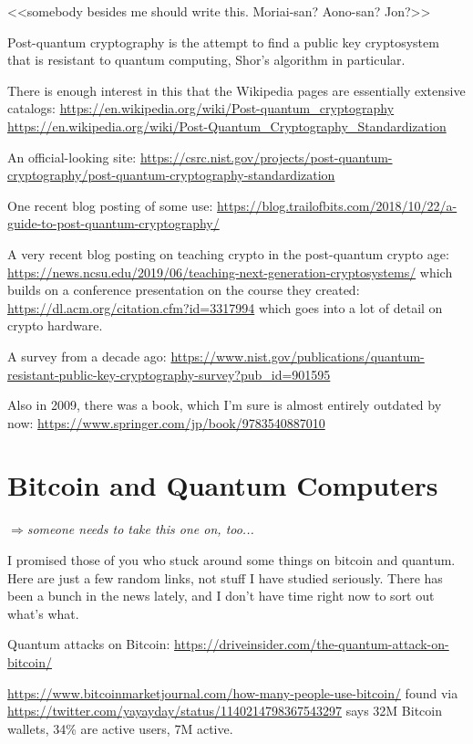 \documentclass[%
 aip,
 jmp,%
 amsmath,amssymb,
 reprint,%
]{revtex4-1}
\def\comment#1{{\color{ForestGreen}$\Rightarrow${\small\em #1}}}
\begin{document}
<<somebody besides me should write this.  Moriai-san?  Aono-san?  Jon?>>

Post-quantum cryptography is the attempt to find a public key
cryptosystem that is resistant to quantum computing, Shor's algorithm
in particular.

There is enough interest in this that the Wikipedia pages are
essentially extensive catalogs:
\url{https://en.wikipedia.org/wiki/Post-quantum_cryptography}
\url{https://en.wikipedia.org/wiki/Post-Quantum_Cryptography_Standardization}

An official-looking site:
\url{https://csrc.nist.gov/projects/post-quantum-cryptography/post-quantum-cryptography-standardization}

One recent blog posting of some use:
\url{https://blog.trailofbits.com/2018/10/22/a-guide-to-post-quantum-cryptography/}

A very recent blog posting on teaching crypto in the post-quantum
crypto age:
\url{https://news.ncsu.edu/2019/06/teaching-next-generation-cryptosystems/}
which builds on a conference presentation on the course they created:
\url{https://dl.acm.org/citation.cfm?id=3317994}
which goes into a lot of detail on crypto hardware.

A survey from a decade ago:
\url{https://www.nist.gov/publications/quantum-resistant-public-key-cryptography-survey?pub_id=901595}

Also in 2009, there was a book, which I'm sure is almost entirely
outdated by now:
\url{https://www.springer.com/jp/book/9783540887010}

\section{Bitcoin and Quantum Computers}

\comment{someone needs to take this one on, too...}

I promised those of you who stuck around some things on bitcoin and
quantum.  Here are just a few random links, not stuff I have studied
seriously.  There has been a bunch in the news lately, and I don't
have time right now to sort out what's what.

Quantum attacks on Bitcoin:
\url{https://driveinsider.com/the-quantum-attack-on-bitcoin/}

\url{https://www.bitcoinmarketjournal.com/how-many-people-use-bitcoin/}
found via
\url{https://twitter.com/yayayday/status/1140214798367543297}
says 32M Bitcoin wallets, 34\% are active users, 7M active.
\end{document}
